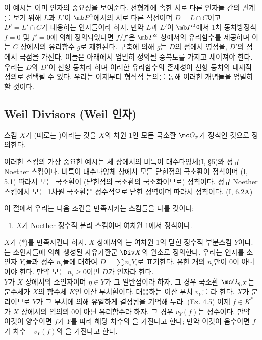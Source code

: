 	이 예시는 이미 인자의 중요성을 보여준다. 선형계에 속한 서로 다른 인자들 간의 관계를 보기 위해
	$L$과 $L'$이 $\mb P^2$에서의 서로 다른 직선이며 $D=L\cap C$이고 $D'=L'\cap C$가 대응하는 인자들이라 하자.
	만약 $L$과 $L'$이 $\mb P^2$에서 1차 동차방정식 $f=0$ 및 $f'=0$에 의해 정의되었다면 $f/f'$은
	$\mb P^2$ 상에서의 유리함수를 제공하며 이는 $C$ 상에서의 유리함수 $g$로 제한된다.
	구축에 의해 $g$는 $D$의 점에서 영점을, $D'$의 점에서 극점을 가진다.
	이들은 아래에서 엄밀히 정의될 중복도를 가지고 세어져야 한다.
	우리는 $D$와 $D'$이 선형 동치라 하며 이러한 유리함수의 존재성이 선형 동치의 내재적 정의로 선택될 수 있다.
	우리는 이제부터 형식적 논의를 통해 이러한 개념들을 엄밀히 할 것이다.
	
	
	\subsection*{Weil Divisors (Weil 인자)}
	
	\begin{definition}
	스킴 $X$가 %
	(때로는 )이라는 것을
	$X$의 차원 1인 모든 국소환 $\mc O_x$가 정칙인 것으로 정의한다.
	\end{definition}
	
	이러한 스킴의 가장 중요한 예시는 체 상에서의 비특이 대수다양체(I, \S 5)와 정규 Noether 스킴이다.
	비특이 대수다양체 상에서 모든 닫힌점의 국소환이 정칙이며 (I, 5.1) 따라서 모든 국소환이 (닫힌점의 국소환의 국소화이므로) 정칙이다.
	정규 Noether 스킴에서 모든 1차원 국소환은 정수적으로 닫힌 정역이며 따라서 정칙이다. (I, 6.2A)
	
	이 절에서 우리는 다음 조건을 만족시키는 스킴들을 다룰 것이다:\\
	\begin{enumerate}[label=(*)]
	\item $X$가 Noether 정수적 분리 스킴이며 여차원 1에서 정칙이다.
	\end{enumerate}
	
	
	\begin{definition}
	$X$가 (*)를 만족시킨다 하자. $X$ 상에서의 는 여차원 1의 닫힌 정수적 부분스킴 $Y$이다.
	는 소인자들에 의해 생성된 자유가환군 $\Div X$의 원소로 정의한다.
	우리는 인자를 소인자 $Y_i$들과 정수 $n_i$들에 대하여 $D=\sum n_iY_i$로 표기한다.
	유한 개의 $n_i$만이 0이 아니어야 한다. 만약 모든 $n_i\ge 0$이면 $D$가 인자라 한다.\\
	$Y$가 $X$ 상에서의 소인자이며 $\eta\in Y$가 그 일반점이라 하자.
	그 경우 국소환 $\mc O_{\eta,X}$는 분수체가 $X$의 함수체 $K$인 이산 부치환이다.
	대응하는 이산 부치 $v_Y$를 라 한다.
	$X$가 분리이므로 $Y$가 그 부치에 의해 유일하게 결정됨을 기억해 두라. (Ex. 4.5)
	이제 $f\in K^*$가 $X$ 상에서의 임의의 0이 아닌 유리함수라 하자. 그 경우 $v_Y(f)$는 정수이다.
	만약 이것이 양수이면 $f$가 $Y$를 따라 해당 차수의 을 가진다고 한다;
	만약 이것이 음수이면 $f$가 차수 $-v_Y(f)$의 을 가진다고 한다.
	\end{definition}
	
